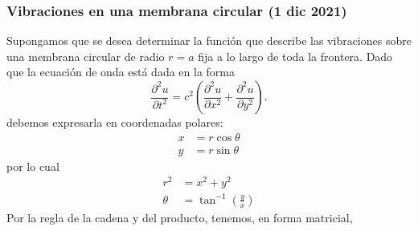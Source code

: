 \documentclass[11pt,letterpaper,draft]{report}
\newcommand\<{\langle}
\renewcommand\>{\rangle}
\begin{document}
\subsubsection{Vibraciones en una membrana circular (1 dic 2021)}
Supongamos que se desea determinar la función que describe las
vibraciones sobre una membrana circular de radio $r=a$ fija a lo largo
de toda la frontera.
Dado que la ecuación de onda está dada en la forma
\[
  \frac{\partial^{2} u}{\partial t^{2}}
  = c^{2} \left(
    \frac{\partial ^{2}u}{\partial x^{2}}
    +\frac{\partial ^{2}u}{\partial y^{2}}
  \right)
.\]
debemos expresarla en coordenadas polares:
\begin{align*}
  x &= r\cos\theta \\
  y &= r\sin\theta
\end{align*}
por lo cual
\begin{align*}
  r^2 &= x^{2}+y^{2} \\
  \theta &= \tan^{-1}(\tfrac{y}{x})
\end{align*}
Por la regla de la cadena y del producto, tenemos, en forma matricial,
\end{document}
